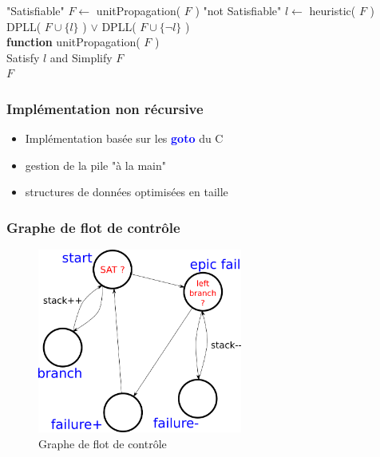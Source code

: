 \documentclass{beamer}
\newcommand{\keyword}[1]{\textbf{\textcolor{blue}{#1}}}
\begin{document}
\begin{algorithm}[h!]
\medskip
\begin{algorithmic}
    \RETURN "Satisfiable"
  \ENDIF
  \STATE $F \gets$ unitPropagation( $F$ )
    \RETURN "not Satisfiable"
  \ENDIF
  \STATE $l \gets$ heuristic( $F$ ) \\
  \RETURN DPLL( $F \cup\{l\}$ ) $\vee$ DPLL( $F \cup \{\lnot l\}$ ) \\
\medskip
\medskip
\textbf{function} unitPropagation( $F$ )\\
  Satisfy $l$ and Simplify $F$ \\
  \RETURN $F$
\ENDWHILE
\end{algorithmic}
\end{algorithm}

\begin{frame}
\frametitle{Implémentation non récursive}

\begin{itemize}
    \item Implémentation basée sur les \keyword{goto} du C
    \item gestion de la pile "à la main"
    \item structures de données optimisées en taille
\end{itemize}
\end{frame}

\begin{frame}
\frametitle{Graphe de flot de contrôle}

\begin{figure}[h]
\includegraphics[width = 0.60\textwidth]{control_flow.png}
  \caption[Graphe de flot de controle]{Graphe de flot de contrôle}
\end{figure}

\end{frame}
\end{document}
